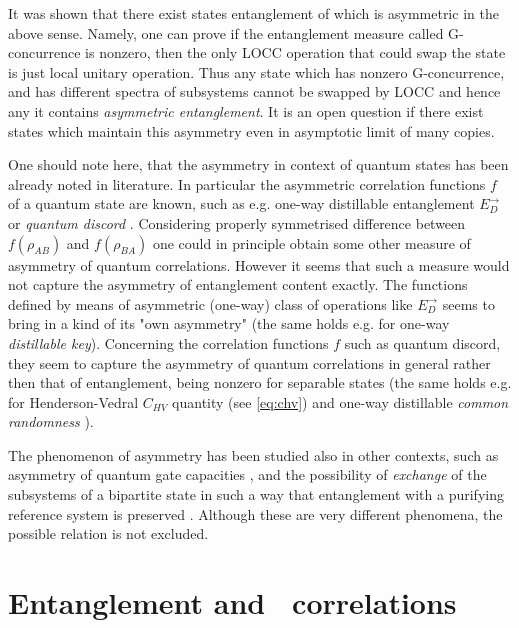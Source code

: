 \documentclass[twocolumn,aps,rmp]{revtex4}
\begin{document}
It was shown that there exist states entanglement of which is asymmetric
in the above sense. Namely, one can prove if the entanglement measure called G-concurrence
\cite{SinoleckaZK2001-manifold,FanMI2002-concurrence,Gour-mon2004} is nonzero,
then the only LOCC operation that could swap the state is just local
unitary operation. Thus any state which has nonzero G-concurrence, and
has different spectra of subsystems cannot be swapped by LOCC and
hence any it contains {\it asymmetric entanglement}. It is an
open question if there exist states which maintain this asymmetry even
in asymptotic limit of many copies.

One should note here, that the asymmetry in context of quantum states
has been already noted in literature. In particular the asymmetric
correlation functions $f$ of a quantum state are known, such as
e.g. one-way distillable entanglement $E_D^{\rightarrow}$
\cite{BBPSSW96} or {\it quantum discord}
\cite{Zurek-discord}. Considering properly symmetrised difference
between $f(\rho_{AB})$ and $f(\rho_{BA})$ one could in principle
obtain some other measure of asymmetry of quantum
correlations. However it seems that such a measure would not capture
the asymmetry of entanglement content exactly. The functions defined
by means of asymmetric (one-way) class of operations like
$E_D^{\rightarrow}$ seems to bring in a kind of its "own asymmetry"
(the same holds e.g. for one-way {\it distillable key}). Concerning
the correlation functions $f$ such as quantum discord, they seem to
capture the asymmetry of quantum correlations in general rather then
that of entanglement, being nonzero for separable states (the same
holds e.g. for Henderson-Vedral $C_{HV}$ quantity (see \ref{eq:chv})
and one-way distillable {\it common randomness}
\cite{DevetakW03-common}).

The phenomenon of asymmetry has been studied also in other contexts,
such as asymmetry of quantum gate capacities
\cite{HarrowShor2005,LindenSW2005-entpower}, and the possibility of
{\it exchange} of the subsystems of a bipartite state in such a way
that entanglement with a purifying reference system is preserved
\cite{uncom_info}. Although these are very different phenomena, the
possible relation is not excluded.




\section{Entanglement and \secure\ correlations}
\label{sec:Ent_in_QKD}
\end{document}
